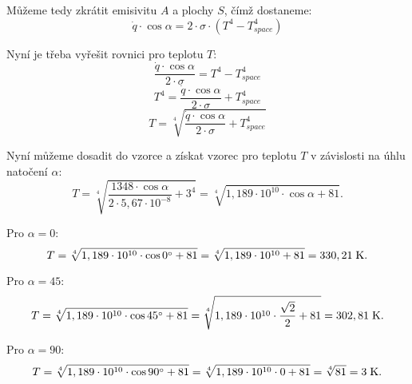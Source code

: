 \documentclass{article}
\begin{document}
Můžeme tedy zkrátit emisivitu $A$ a plochy $S$, čímž dostaneme:
$$
    \dot{q} \cdot \cos \alpha = 2 \cdot \sigma \cdot \left( T^4 - T_{space}^4 \right)
$$

Nyní je třeba vyřešit rovnici pro teplotu $T$:
$$
    \frac{\dot{q} \cdot \cos \alpha}{2 \cdot \sigma} = T^4 - T_{space}^4
$$
$$
    T^4 = \frac{\dot{q} \cdot \cos \alpha}{2 \cdot \sigma} + T_{space}^4
$$
$$
    T = \sqrt[4]{\frac{\dot{q} \cdot \cos \alpha}{2 \cdot \sigma} + T_{space}^4}
$$

Nyní můžeme dosadit do vzorce a získat vzorec pro teplotu $T$ v závislosti na úhlu natočení $\alpha$:
$$
    T = \sqrt[4]{\frac{1348 \cdot \cos \alpha}{2 \cdot 5,67 \cdot 10^{-8}} + 3^4} = \sqrt[4]{1,189 \cdot 10^{10} \cdot \cos \alpha + 81}.
$$

Pro $\alpha = 0$:
$$
    T = \sqrt[4]{1,189 \cdot 10^{10} \cdot \cos 0 ^\circ + 81} = \sqrt[4]{1,189 \cdot 10^{10} + 81} = 330,21 \; \textrm{K}.
$$

Pro $\alpha = 45$:
$$
    T = \sqrt[4]{1,189 \cdot 10^{10} \cdot \cos 45 ^\circ + 81} = \sqrt[4]{1,189 \cdot 10^{10} \cdot \frac{\sqrt{2}}{2} + 81} = 302,81 \; \textrm{K}.
$$

Pro $\alpha = 90$:
$$
    T = \sqrt[4]{1,189 \cdot 10^{10} \cdot \cos 90 ^\circ + 81} = \sqrt[4]{1,189 \cdot 10^{10} \cdot 0 + 81} = \sqrt[4]{81} = 3 \; \textrm{K}.
$$
\end{document}
